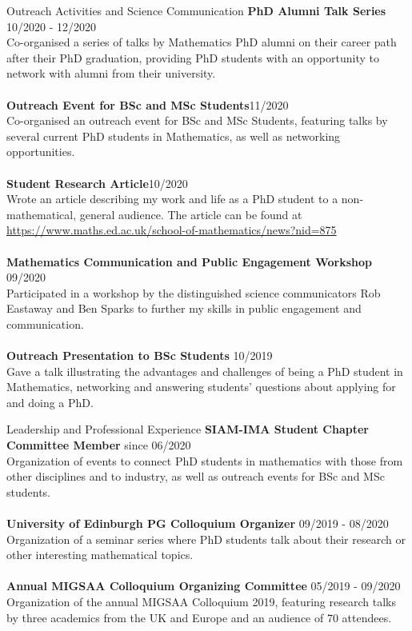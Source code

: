 \documentclass{resume} %
\begin{document}
\begin{rSection}{Outreach Activities and Science Communication}
	{\bf PhD Alumni Talk Series} \hfill{10/2020 - 12/2020}\\
	Co-organised a series of talks by Mathematics PhD alumni on their career path after their PhD graduation, providing PhD students with an opportunity to network with alumni from their university.\\
	\\
	{\bf Outreach Event for BSc and MSc Students}\hfill{11/2020}\\
	Co-organised an outreach event for BSc and MSc Students, featuring talks by several current PhD students in Mathematics, as well as networking opportunities. \\
	\\
	{ \bf Student Research Article}\hfill{10/2020}\\
	Wrote an article describing my work and life as a PhD student to a non-mathematical, general audience. The article can be found at  \url{https://www.maths.ed.ac.uk/school-of-mathematics/news?nid=875} \\
	\\
	{ \bf Mathematics Communication and Public Engagement Workshop} \hfill{09/2020}\\
	Participated in a workshop by the distinguished science communicators Rob Eastaway and Ben Sparks to further my skills in public engagement and communication.\\
	\\
	{\bf Outreach Presentation to BSc Students} \hfill{10/2019}\\
	Gave a talk illustrating the advantages and challenges of being a PhD student in Mathematics, networking and answering students' questions about applying for and doing a PhD. 
\end{rSection}
\begin{rSection}{Leadership and Professional Experience}
	{\bf SIAM-IMA Student Chapter Committee Member} \hfill{since 06/2020}\\
	Organization of events to connect PhD students in mathematics with those from other disciplines and to industry, as well as outreach events for BSc and MSc students.\\
	\\
	{\bf University of Edinburgh PG Colloquium Organizer} \hfill{09/2019 - 08/2020}\\
	Organization of a seminar series where PhD students talk about their research or other interesting mathematical topics.\\
	\\
	{\bf Annual MIGSAA Colloquium Organizing Committee} \hfill{05/2019 - 09/2020}\\
	Organization of the annual MIGSAA Colloquium 2019, featuring research talks by three academics from the UK and Europe and an audience of 70 attendees.\\
	\\
\end{rSection}
\end{document}
